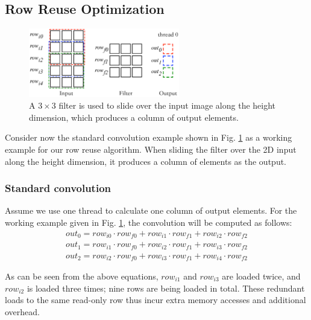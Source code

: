 \subsection{Row Reuse Optimization}
\label{sec:rowreuse}
\begin{figure}[t!]
	\centering
	\includegraphics[width=0.8\columnwidth,height=3cm]{./figure/rowreuse.eps}
	\vspace{-3mm}
\caption{A $3 \times 3$ filter is used to slide over the input image along the height dimension, which produces a column of output elements.}
\label{fig:rowreuse}
\end{figure}

 Consider now the standard convolution example shown in Fig. \ref{fig:rowreuse} as a working example for our row
reuse algorithm. When sliding the filter over the 2D input along the height dimension, it produces a column of elements as the output.

\subsubsection{Standard convolution} Assume we use one thread to calculate one column of output elements.
For the working example given in Fig. \ref{fig:rowreuse}, the convolution will be computed as follows:
\begin{gather*}
  out_0=row_{i0} \cdot row_{f0} + row_{i1} \cdot row_{f1} + row_{i2} \cdot row_{f2} \\
out_{1}=row_{i1} \cdot row_{f0} + row_{i2} \cdot row_{f1} + row_{i3} \cdot row_{f2} \\
out_{2}=row_{i2} \cdot row_{f0} + row_{i3} \cdot row_{f1} + row_{i4} \cdot row_{f2}
\end{gather*}

As can be seen from the above equations, $row_{i1}$ and $row_{i3}$ are loaded twice, and $row_{i2}$ is loaded three times; nine rows are being loaded in total. These redundant loads to the same read-only row thus incur extra memory accesses and additional overhead.

